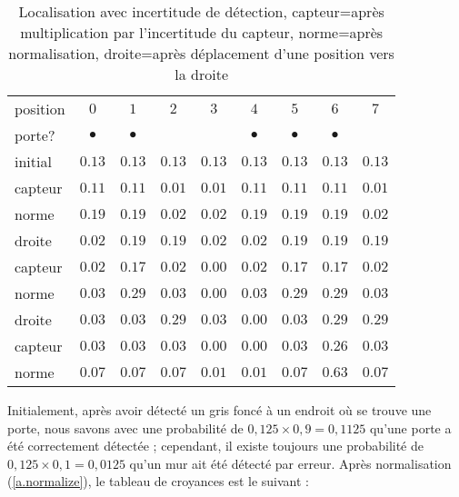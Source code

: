\begin{table}
\caption[Localisation avec incertitude de détection]{Localisation avec incertitude de détection, capteur=après multiplication par l'incertitude du capteur, norme=après normalisation, droite=après déplacement d'une position vers la droite}
\label{tab.uncertain-sensing}
\setlength{\tabcolsep}{6pt}
\begin{tabular}{l|rrrrrrrr}
\hline
position&\multicolumn{1}{c}{$0$}&\multicolumn{1}{c}{$1$}&\multicolumn{1}{c}{$2$}&\multicolumn{1}{c}{$3$}&\multicolumn{1}{c}{$4$}&\multicolumn{1}{c}{$5$}&\multicolumn{1}{c}{$6$}&\multicolumn{1}{c}{$7$}\\
porte?&\multicolumn{1}{c}{$\bullet$}&\multicolumn{1}{c}{$\bullet$}&&&\multicolumn{1}{c}{$\bullet$}&\multicolumn{1}{c}{$\bullet$}&\multicolumn{1}{c}{$\bullet$}&\\
\hline
initial &$0.13$ & $0.13$ & $0.13$ & $0.13$ & $0.13$ & $0.13$ & $0.13$ & $0.13$\\
capteur  &$0.11$ & $0.11$ & $0.01$ & $0.01$ & $0.11$ & $0.11$ & $0.11$ & $0.01$\\
norme    &$0.19$ & $0.19$ & $0.02$ & $0.02$ & $0.19$ & $0.19$ & $0.19$ & $0.02$\\
\hline
droite   &$0.02$ & $0.19$ & $0.19$ & $0.02$ & $0.02$ & $0.19$ & $0.19$ & $0.19$\\
capteur  &$0.02$ & $0.17$ & $0.02$ & $0.00$ & $0.02$ & $0.17$ & $0.17$ & $0.02$\\
norme    &$0.03$ & $0.29$ & $0.03$ & $0.00$ & $0.03$ & $0.29$ & $0.29$ & $0.03$\\
\hline
droite   &$0.03$ & $0.03$ & $0.29$ & $0.03$ & $0.00$ & $0.03$ & $0.29$ & $0.29$\\
capteur  &$0.03$ & $0.03$ & $0.03$ & $0.00$ & $0.00$ & $0.03$ & $0.26$ & $0.03$\\
norme    &$0.07$ & $0.07$ & $0.07$ & $0.01$ & $0.01$ & $0.07$ & $0.63$ & $0.07$\\
\hline
\end{tabular}
\end{table}
Initialement, après avoir détecté un gris foncé à un endroit où se trouve une porte, nous savons avec une probabilité de $0,125 \times 0,9 = 0,1125$ qu'une porte a été correctement détectée ; cependant, il existe toujours une probabilité de $0,125 \times 0,1 = 0,0125$ qu'un mur ait été détecté par erreur. Après normalisation (\ref{a.normalize}), le tableau de croyances est le suivant :
\begin{center}
\end{center}
